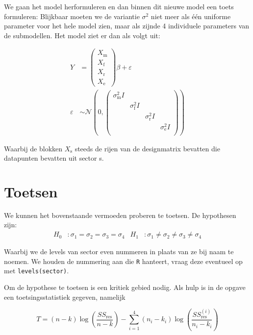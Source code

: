 \documentclass[a4paper]{report}
\begin{document}
  We gaan het model herformuleren en dan binnen dit nieuwe model een toets formuleren: Blijkbaar moeten we de variantie $\sigma^2$ niet meer als \' e\' en uniforme parameter voor het hele model zien, maar als zijnde 4 individuele parameters van de submodellen. Het model ziet er dan als volgt uit:
  
  \begin{align}
  Y &= \begin{pmatrix} X_{\text{m}}  \\ X_{\text{f}} \\ X_{\text{r}} \\ X_{\text{e}} \end{pmatrix}\beta + \varepsilon \\
  \varepsilon &\sim \mathcal{N}(0,
  \begin{pmatrix} 
  \sigma_{\text{m}}^2I & & & \\ 
  & \sigma_{\text{f}}^2I & & \\ 
  & & \sigma_{\text{r}}^2I & \\
  & & & \sigma_{\text{e}}^2I \\
  \end{pmatrix})
  \end{align}
  
  Waarbij de blokken $X_{\text{s}}$ steeds de rijen van de designmatrix bevatten die datapunten bevatten uit sector s.
  
\section{Toetsen}

  We kunnen het bovenstaande vermoeden proberen te toetsen. De hypothesen zijn:
  \begin{align}
  H_0&: \sigma_1=\sigma_2=\sigma_3=\sigma_4 & H_1&: \sigma_1
  \neq \sigma_2 \neq \sigma_3 \neq \sigma_4
  \end{align}
  
  Waarbij we de levels van sector even nummeren in plaats van ze bij naam te noemen. We houden de nummering aan die \verb!R! hanteert, vraag deze eventueel op met \verb!levels(sector)!.
  
  Om de hypothese te toetsen is een kritiek gebied nodig. Als hulp is in de opgave een toetsingsstatistiek gegeven, namelijk 
  
  \begin{equation*}
    T = (n-k)\log(\frac{SS_{\text{res}}}{n-k}) - \sum_{i=1}^4 (n_i-k_i)\log(\frac{SS_{\text{res}}^{(i)}}{n_i-k_i})
  \end{equation*}
  
\end{document}
